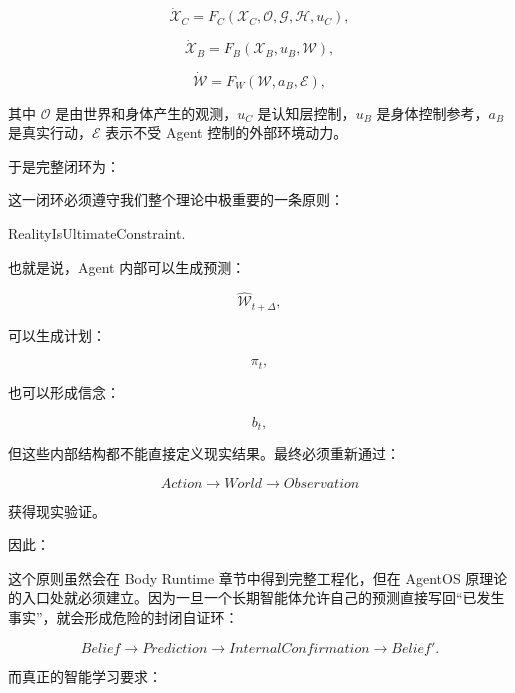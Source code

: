 \[
\dot{\mathcal{X}}_C
=
F_C
\left(
\mathcal{X}_C,
\mathcal{O},
\mathcal{G},
\mathcal{H},
u_C
\right),
\]

\[
\dot{\mathcal{X}}_B
=
F_B
\left(
\mathcal{X}_B,
u_B,
\mathcal{W}
\right),
\]

\[
\dot{\mathcal{W}}
=
F_W
\left(
\mathcal{W},
a_B,
\mathcal{E}
\right),
\]

其中 $\mathcal{O}$ 是由世界和身体产生的观测，$u_C$ 是认知层控制，$u_B$ 是身体控制参考，$a_B$ 是真实行动，$\mathcal{E}$ 表示不受 Agent 控制的外部环境动力。

于是完整闭环为：

\begin{statementbox}
\centering
{}
\end{statementbox}

这一闭环必须遵守我们整个理论中极重要的一条原则：

\begin{statementbox}
RealityIsUltimateConstraint.
\end{statementbox}

也就是说，Agent 内部可以生成预测：

\[
\hat{\mathcal{W}}_{t+\Delta},
\]

可以生成计划：

\[
\pi_t,
\]

也可以形成信念：

\[
b_t,
\]

但这些内部结构都不能直接定义现实结果。最终必须重新通过：

\[
Action
\rightarrow
World
\rightarrow
Observation
\]

获得现实验证。

因此：

\begin{statementbox}
\centering
{}
\end{statementbox}

这个原则虽然会在 Body Runtime 章节中得到完整工程化，但在 AgentOS 原理论的入口处就必须建立。因为一旦一个长期智能体允许自己的预测直接写回“已发生事实”，就会形成危险的封闭自证环：

\[
Belief
\rightarrow
Prediction
\rightarrow
InternalConfirmation
\rightarrow
Belief'.
\]

而真正的智能学习要求：

